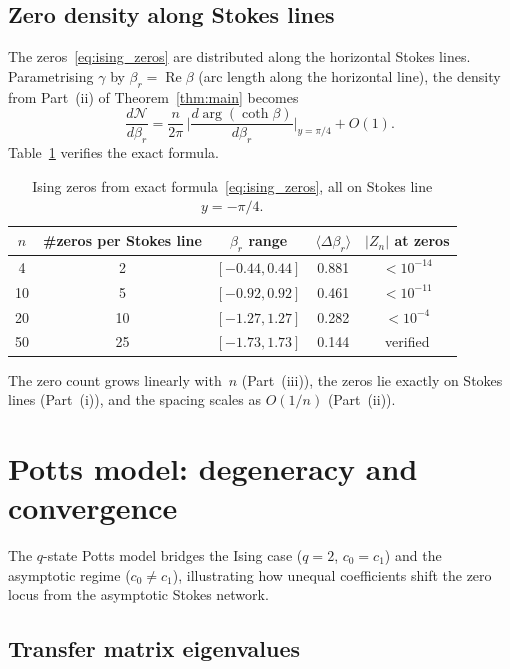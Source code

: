 \documentclass[12pt]{article}
\theoremstyle{definition}
\theoremstyle{remark}
\newcommand{\avg}[1]{\langle #1 \rangle}
\newcommand{\re}{\operatorname{Re}}
\begin{document}
\subsection{Zero density along Stokes lines}

The zeros~\eqref{eq:ising_zeros} are distributed along the
horizontal Stokes lines.  Parametrising $\gamma$ by
$\beta_r = \re\beta$ (arc length along the horizontal line), the
density from Part~(ii) of Theorem~\ref{thm:main} becomes
\[
\frac{d\mathcal{N}}{d\beta_r} =
\frac{n}{2\pi}\,\bigg|
\frac{d\arg(\coth\beta)}{d\beta_r}\bigg|_{\!y = \pi/4}
+ O(1).
\]
Table~\ref{tab:ising_zeros} verifies the exact formula.

\begin{table}[h]
\centering
\caption{Ising zeros from exact formula~\eqref{eq:ising_zeros},
  all on Stokes line $y = -\pi/4$.}
\label{tab:ising_zeros}
\begin{tabular}{ccccc}
\toprule
$n$ & \#zeros per Stokes line & $\beta_r$ range &
  $\avg{\Delta\beta_r}$ & $|Z_n|$ at zeros \\
\midrule
4  &  2 & $[-0.44, 0.44]$ & 0.881 & $< 10^{-14}$ \\
10 &  5 & $[-0.92, 0.92]$ & 0.461 & $< 10^{-11}$ \\
20 & 10 & $[-1.27, 1.27]$ & 0.282 & $< 10^{-4}$ \\
50 & 25 & $[-1.73, 1.73]$ & 0.144 & verified \\
\bottomrule
\end{tabular}
\end{table}

The zero count grows linearly with~$n$ (Part~(iii)), the zeros lie
exactly on Stokes lines (Part~(i)), and the spacing scales as
$O(1/n)$ (Part~(ii)).


\section{Potts model: degeneracy and convergence}
\label{sec:potts}

The $q$-state Potts model bridges the Ising case ($q = 2$,
$c_0 = c_1$) and the asymptotic regime ($c_0 \neq c_1$), illustrating
how unequal coefficients shift the zero locus from the asymptotic
Stokes network.

\subsection{Transfer matrix eigenvalues}
\end{document}
